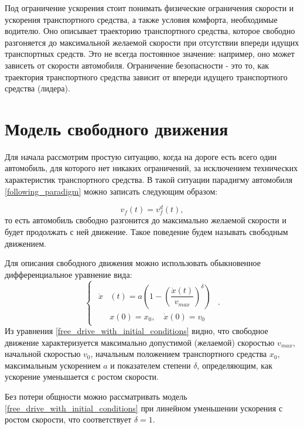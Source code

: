 \documentclass[12pt, a4paper]{extarticle}
\numberwithin{equation}{section}
\begin{document}
Под ограничение ускорения стоит понимать физические ограничения скорости и ускорения транспортного средства, а также условия комфорта, необходимые водителю. Оно описывает траекторию транспортного средства, которое свободно разгоняется до максимальной желаемой скорости при отсутствии впереди идущих транспортных средств. Это не всегда постоянное значение: например, оно может зависеть от скорости автомобиля. Ограничение безопасности - это то, как траектория транспортного средства зависит от впереди идущего транспортного средства (лидера).

\section{Модель свободного движения}

Для начала рассмотрим простую ситуацию, когда на дороге есть всего один автомобиль, для которого нет никаких ограничений, за исключением технических характеристик транспортного средства. В такой ситуации парадигму автомобиля \eqref{following_paradigm} можно записать следующим образом:

\begin{equation} \label{following_paradigm_alone}
v_f(t) = v_f^d(t),
\end{equation}
то есть автомобиль свободно разгонится до максимально желаемой скорости и будет продолжать с ней движение. Такое поведение будем называть свободным движением. 

Для описания свободного движения можно использовать обыкновенное дифференциальное уравнение вида: 
\begin{equation} \label{free_drive_with_initial_conditions}
\begin{cases}
\begin{split}
\ddot{x}&(t) = a\left( 1-\left( \dfrac{\dot{x}(t)}{v_{max}}\right)^\delta \right) \\
&x(0)=x_0, \quad \dot{x}(0)=v_{0}
\end{split}
\end{cases}.
\end{equation}
Из уравнения \eqref{free_drive_with_initial_conditions} видно, что свободное движение характеризуется максимально допустимой (желаемой) скоростью $v_{max}$, начальной скоростью $v_{0}$, начальным положением транспортного средства $x_0$, максимальным ускорением $a$ и показателем степени $\delta$, определяющим, как ускорение уменьшается с ростом скорости.

Без потери общности можно рассматривать модель \eqref{free_drive_with_initial_conditions} при линейном уменьшении ускорения с ростом скорости, что соответствует $\delta=1$.
\end{document}
